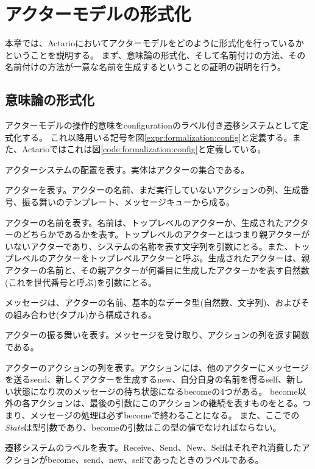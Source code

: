 \chapter{アクターモデルの形式化}
\label{chapter:formalization}

本章では、Actarioにおいてアクターモデルをどのように形式化を行っているかということを説明する。
まず、意味論の形式化、そして名前付けの方法、その名前付けの方法が一意な名前を生成するということの証明の説明を行う。


\section{意味論の形式化}

アクターモデルの操作的意味をconfigurationのラベル付き遷移システムとして定式化する。
これ以降用いる記号を図\ref{expr:formalization:config}と定義する。また、Actarioではこれは図\ref{code:formalization:config}と定義している。

\begin{description}[style=nextline,leftmargin=12pt,parsep=0pt]
\item[\textit{Configuration}]
  アクターシステムの配置を表す。実体はアクターの集合である。
\item[\textit{Actor}]
  アクターを表す。アクターの名前、まだ実行していないアクションの列、生成番号、振る舞いのテンプレート、メッセージキューから成る。
\item[\textit{Name}]
  アクターの名前を表す。名前は、トップレベルのアクターか、生成されたアクターのどちらかであるかを表す。トップレベルのアクターとはつまり親アクターがいないアクターであり、システムの名称を表す文字列を引数にとる。また、トップレベルのアクターをトップレベルアクターと呼ぶ。生成されたアクターは、親アクターの名前と、その親アクターが何番目に生成したアクターかを表す自然数(これを世代番号と呼ぶ)を引数にとる。
\item[\textit{Message}]
  メッセージは、アクターの名前、基本的なデータ型(自然数、文字列)、およびその組み合わせ(タプル)から構成される。
\item[\textit{Behavior State}]
  アクターの振る舞いを表す。メッセージを受け取り、アクションの列を返す関数である。
\item[\textit{Actions State}]
  アクターのアクションの列を表す。アクションには、他のアクターにメッセージを送る\textsf{send}、新しくアクターを生成する\textsf{new}、自分自身の名前を得る\textsf{self}、新しい状態になり次のメッセージの待ち状態になる\textsf{become}の4つがある。
  \textsf{become}以外の各アクションは、最後の引数にこのアクションの継続を表すものをとる。つまり、メッセージの処理は必ず\textsf{become}で終わることになる。
  また、ここでの\textit{State}は型引数であり、\textsf{become}の引数はこの型の値でなければならない。
\item[\textit{Label}]
  遷移システムのラベルを表す。\textsf{Receive}、\textsf{Send}、\textsf{New}、\textsf{Self}はそれぞれ消費したアクションが\textsf{become}、\textsf{send}、\textsf{new}、\textsf{self}であったときのラベルである。
\end{description}


